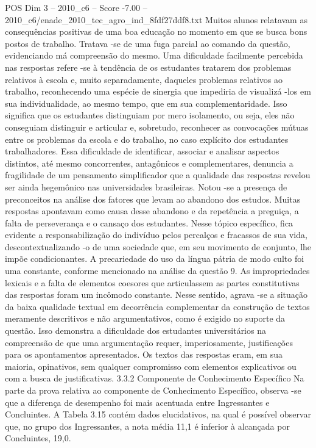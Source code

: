 \begin{textsample}{POS Dim 3 – 2010\_c6 – Score -7.00 – 2010\_c6/enade\_2010\_tec\_agro\_ind\_8fdf27ddf8.txt}
Muitos alunos relatavam as consequências positivas de uma boa educação no momento em que se busca bons postos de trabalho.
Tratava -se de uma fuga parcial ao comando da questão, evidenciando má compreensão do mesmo.
Uma dificuldade facilmente percebida nas respostas refere -se à tendência de os estudantes tratarem dos problemas relativos à escola e, muito separadamente, daqueles problemas relativos ao trabalho, reconhecendo uma espécie de sinergia que impediria de visualizá -los em sua individualidade, ao mesmo tempo, que em sua complementaridade.
Isso significa que os estudantes distinguiam por mero isolamento, ou seja, eles não conseguiam distinguir e articular e, sobretudo, reconhecer as convocações mútuas entre os problemas da escola e do trabalho, no caso explícito dos estudantes trabalhadores.
Essa dificuldade de identificar, associar e analisar aspectos distintos, até mesmo concorrentes, antagônicos e complementares, denuncia a fragilidade de um pensamento simplificador que a qualidade das respostas revelou ser ainda hegemônico nas universidades brasileiras.
Notou -se a presença de preconceitos na análise dos fatores que levam ao abandono dos estudos.
Muitas respostas apontavam como causa desse abandono e da repetência a preguiça, a falta de perseverança e o cansaço dos estudantes.
Nesse tópico específico, fica evidente a responsabilização do indivíduo pelos percalços e fracassos de sua vida, descontextualizando -o de uma sociedade que, em seu movimento de conjunto, lhe impõe condicionantes.
A precariedade do uso da língua pátria de modo culto foi uma constante, conforme mencionado na análise da questão 9.
As impropriedades lexicais e a falta de elementos coesores que articulassem as partes constitutivas das respostas foram um incômodo constante.
Nesse sentido, agrava -se a situação da baixa qualidade textual em decorrência complementar da construção de textos meramente descritivos e não argumentativos, como é exigido no suporte da questão.
Isso demonstra a dificuldade dos estudantes universitários na compreensão de que uma argumentação requer, imperiosamente, justificações para os apontamentos apresentados.
Os textos das respostas eram, em sua maioria, opinativos, sem qualquer compromisso com elementos explicativos ou com a busca de justificativas. 3.3.2 Componente de Conhecimento Específico Na parte da prova relativa ao componente de Conhecimento Específico, observa -se que a diferença de desempenho foi mais acentuada entre Ingressantes e Concluintes.
A Tabela 3.15 contém dados elucidativos, na qual é possível observar que, no grupo dos Ingressantes, a nota média 11,1 é inferior à alcançada por Concluintes, 19,0.

\end{textsample}
